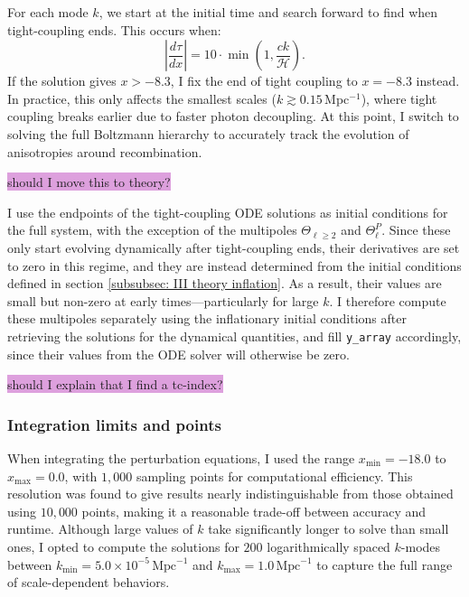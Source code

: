 \documentclass{aa}
\numberwithin{equation}{section}
\numberwithin{table}{section}
\numberwithin{figure}{section}
\begin{document}
For each mode $k$, we start at the initial time and search forward to find when tight-coupling ends. This occurs when:
\begin{equation}
\left| \frac{d\tau}{dx} \right| = 10 \cdot \min\left(1, \frac{ck}{\mathcal{H}} \right).
\end{equation}
If the solution gives $x > -8.3$, I fix the end of tight coupling to $x = -8.3$ instead. In practice, this only affects the smallest scales ($k \gtrsim 0.15\,$Mpc$^{-1}$), where tight coupling breaks earlier due to faster photon decoupling. At this point, I switch to solving the full Boltzmann hierarchy to accurately track the evolution of anisotropies around recombination. 

\colorbox{Plum}{should I move this to theory?}

I use the endpoints of the tight-coupling ODE solutions as initial conditions for the full system, with the exception of the multipoles $\Theta_{\ell \geq 2}$ and $\Theta^P_\ell$. Since these only start evolving dynamically after tight-coupling ends, their derivatives are set to zero in this regime, and they are instead determined from the initial conditions defined in section \ref{subsubsec: III theory inflation}. As a result, their values are small but non-zero at early times—particularly for large $k$. I therefore compute these multipoles separately using the inflationary initial conditions after retrieving the solutions for the dynamical quantities, and fill \verb|y_array| accordingly, since their values from the ODE solver will otherwise be zero.


\colorbox{Plum}{should I explain that I find a tc-index?}


\subsubsection{Integration limits and points}\label{subsubsec: III methods limits}
When integrating the perturbation equations, I used the range $x_\text{min} = -18.0$ to $x_\text{max} = 0.0$, with $1,000$ sampling points for computational efficiency. This resolution was found to give results nearly indistinguishable from those obtained using $10,000$ points, making it a reasonable trade-off between accuracy and runtime. Although large values of $k$ take significantly longer to solve than small ones, I opted to compute the solutions for $200$ logarithmically spaced $k$-modes between $k_\text{min} = 5.0 \times 10^{-5}\,\text{Mpc}^{-1}$ and $k_\text{max} = 1.0\,\text{Mpc}^{-1}$ to capture the full range of scale-dependent behaviors.
\end{document}
